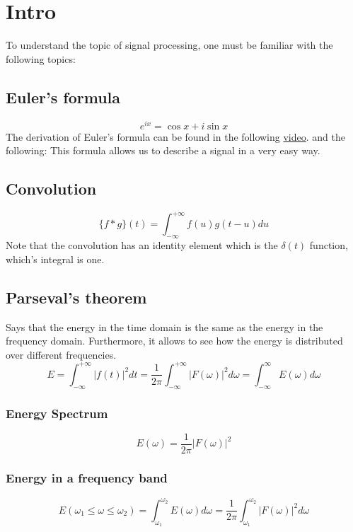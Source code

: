 \section{Intro}
To understand the topic of signal processing, one must be familiar with the following topics:
\subsection{Euler's formula}
$$
e^{i x}=\cos x+i \sin x
$$
The derivation of Euler's formula can be found in the following \href{https://youtu.be/sKtloBAuP74}{video}.
and the following:
This formula allows us to describe a signal in a very easy way.
\subsection{Convolution}
$$
\{f * g\}(t)=\int_{-\infty}^{+\infty} f(u) g(t-u) d u
$$
Note that the convolution has an identity element which is the $\delta(t)$ function, which's integral is one.
\subsection{Parseval's theorem}
Says that the energy in the time domain is the same as the energy in the frequency domain. Furthermore, it allows to see how the energy is distributed over different frequencies.
$$
E=\int_{-\infty}^{+\infty}|f(t)|^2 d t=\frac{1}{2 \pi} \int_{-\infty}^{+\infty}|F(\omega)|^2 d \omega=\int_{-\infty}^{\infty} E(\omega) d \omega
$$
\subsubsection{Energy Spectrum}
$$
E(\omega)=\frac{1}{2 \pi}|F(\omega)|^2
$$
\subsubsection{Energy in a frequency band}
$$
E\left(\omega_1 \leq \omega \leq \omega_2\right)=\int_{\omega_1}^{\omega_2} E(\omega) d \omega=\frac{1}{2 \pi} \int_{\omega_1}^{\omega_2}|F(\omega)|^2 d \omega
$$
